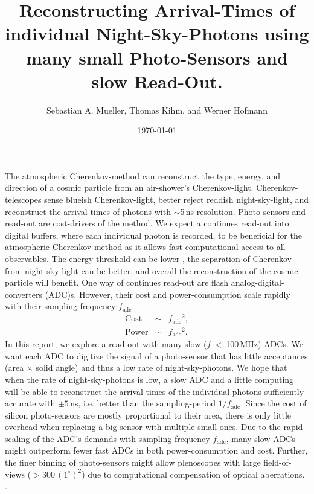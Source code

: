 \documentclass{article}%
\title{
    Reconstructing Arrival-Times of individual Night-Sky-Photons using many small Photo-Sensors and slow Read-Out.
}%
\author{Sebastian A. Mueller, Thomas Kihm, and Werner Hofmann}%
\date{\today{}}%
\begin{document}
%
\maketitle%

\newcommand{\F}{F_\text{nsb}}
\newcommand{\Ftyp}{F_\text{typical}}
\newcommand{\Apulse}{A_\text{pulse}}
\newcommand{\fadc}{f_\text{adc}}
\newcommand{\fproc}{f_\text{proc}}

\begin{multicols}{2}%
%
The atmospheric Cherenkov-method can reconstruct the type, energy, and direction of a cosmic particle from an air-shower's Cherenkov-light.
%
Cherenkov-telescopes sense blueish Cherenkov-light, better reject reddish night-sky-light, and reconstruct the arrival-times of photons with $\sim{}$5\,ns resolution.
%
Photo-sensors and read-out are cost-drivers of the method.
\newline
%
We expect a continues read-out into digital buffers, where each individual photon is recorded, to be beneficial for the atmospheric Cherenkov-method as it allows fast computational access to all observables.
%
The energy-threshold can be lower \cite{jung2005star}, the separation of Cherenkov- from night-sky-light can be better, and overall the reconstruction of the cosmic particle will benefit\cite{catalano2008single}.
\newline
%
One way of continues read-out are flash analog-digital-converters (ADC)s.
%
However, their cost and power-consumption scale rapidly with their sampling frequency $\fadc{}$.
%
\begin{eqnarray*}
\text{Cost} &\sim& \fadc{}^2,\\
\text{Power} &\sim& \fadc{}^2.
\end{eqnarray*}
%
In this report, we explore a read-out with many slow \mbox{($f$ < 100\,MHz)} ADCs.
%
We want each ADC to digitize the signal of a photo-sensor that has little acceptances (area $\times{}$ solid angle) and thus a low rate of night-sky-photons.
%
We hope that when the rate of night-sky-photons is low, a slow ADC and a little computing will be able to reconstruct the arrival-times of the individual photons sufficiently accurate with $\pm5\,$ns, i.e. better than the sampling-period $1/\fadc{}$.
%
Since the cost of silicon photo-sensors are mostly proportional to their area, there is only little overhead when replacing a big sensor with multiple small ones.
%
Due to the rapid scaling of the ADC's demands with sampling-frequency $\fadc{}$, many slow ADCs might outperform fewer fast ADCs in both power-consumption and cost.
\newline
Further, the finer binning of photo-sensors might allow plenoscopes with large  field-of-views ($> 300\,(1^\circ{})^2$) due to computational compensation of optical aberrations. \cite{mueller2019phd}.
%

\end{multicols}
\end{document}
